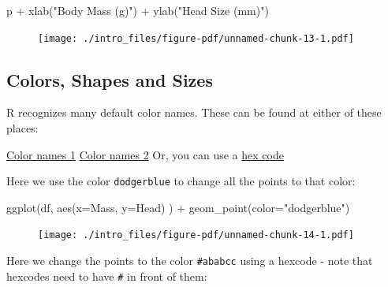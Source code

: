 \documentclass[
  letterpaper,
  DIV=11,
  numbers=noendperiod]{scrreprt}
\newenvironment{Shaded}{\begin{snugshade}}{\end{snugshade}}
\newcommand{\AttributeTok}[1]{\textcolor[rgb]{0.40,0.45,0.13}{#1}}
\newcommand{\FunctionTok}[1]{\textcolor[rgb]{0.28,0.35,0.67}{#1}}
\newcommand{\NormalTok}[1]{\textcolor[rgb]{0.00,0.23,0.31}{#1}}
\newcommand{\SpecialCharTok}[1]{\textcolor[rgb]{0.37,0.37,0.37}{#1}}
\newcommand{\StringTok}[1]{\textcolor[rgb]{0.13,0.47,0.30}{#1}}
\begin{document}
\begin{Shaded}
\begin{Highlighting}[]
\NormalTok{p }\SpecialCharTok{+} \FunctionTok{xlab}\NormalTok{(}\StringTok{"Body Mass (g)"}\NormalTok{) }\SpecialCharTok{+} \FunctionTok{ylab}\NormalTok{(}\StringTok{"Head Size (mm)"}\NormalTok{)}
\end{Highlighting}
\end{Shaded}

\begin{figure}[H]

{\centering \texttt{[image: ./intro\_files/figure-pdf/unnamed-chunk-13-1.pdf]}

}

\end{figure}

\hypertarget{colors-shapes-and-sizes}{%
\subsection{Colors, Shapes and Sizes}\label{colors-shapes-and-sizes}}

R recognizes many default color names. These can be found at either of
these places:

\href{https://www.datanovia.com/en/blog/awesome-list-of-657-r-color-names/}{Color
names 1}
\href{http://www.stat.columbia.edu/~tzheng/files/Rcolor.pdf}{Color names
2} Or, you can use a \href{https://htmlcolorcodes.com/color-picker/}{hex
code}

Here we use the color \texttt{dodgerblue} to change all the points to
that color:

\begin{Shaded}
\begin{Highlighting}[]
\FunctionTok{ggplot}\NormalTok{(df, }\FunctionTok{aes}\NormalTok{(}\AttributeTok{x=}\NormalTok{Mass, }\AttributeTok{y=}\NormalTok{Head) ) }\SpecialCharTok{+} \FunctionTok{geom\_point}\NormalTok{(}\AttributeTok{color=}\StringTok{"dodgerblue"}\NormalTok{)}
\end{Highlighting}
\end{Shaded}

\begin{figure}[H]

{\centering \texttt{[image: ./intro\_files/figure-pdf/unnamed-chunk-14-1.pdf]}

}

\end{figure}

Here we change the points to the color \texttt{\#ababcc} using a hexcode
- note that hexcodes need to have \texttt{\#} in front of them:
\end{document}
